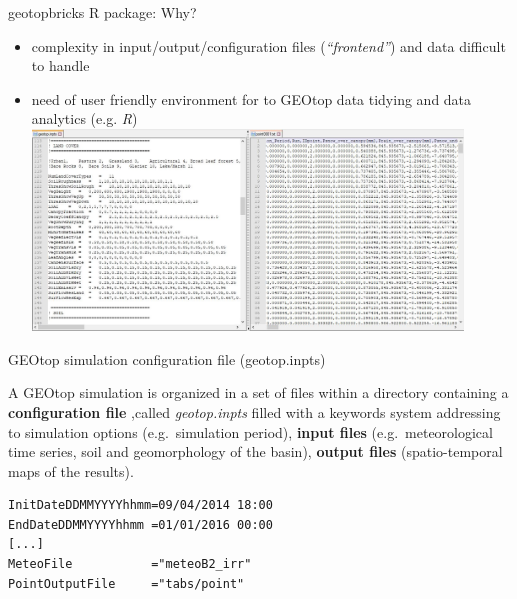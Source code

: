 \documentclass[ignorenonframetext,]{beamer}
\providecommand{\tightlist}{%
  \setlength{\itemsep}{0pt}\setlength{\parskip}{0pt}}
\begin{document}
\begin{frame}{geotopbricks R package: Why?}

\begin{itemize}
\tightlist
\item
  complexity in input/output/configuration files (\emph{``frontend''})
  and data difficult to handle
\item
  need of user friendly environment for to GEOtop data tidying and data
  analytics (e.g. \emph{R})
  \includegraphics[width=0.90000\textwidth]{resources/images/Capture_IO_GEOtopJPG.JPG}\\
\end{itemize}

\end{frame}

\begin{frame}[fragile]{GEOtop simulation configuration file
(geotop.inpts)}

A GEOtop simulation is organized in a set of files within a directory
containing a \textbf{configuration file} ,called \emph{geotop.inpts}
filled with a keywords system addressing to simulation options
(e.g.~simulation period), \textbf{input files} (e.g.~meteorological time
series, soil and geomorphology of the basin), \textbf{output files}
(spatio-temporal maps of the results).

\begin{verbatim}
InitDateDDMMYYYYhhmm=09/04/2014 18:00  
EndDateDDMMYYYYhhmm =01/01/2016 00:00 
[...] 
MeteoFile           ="meteoB2_irr" 
PointOutputFile     ="tabs/point" 
\end{verbatim}

\end{frame}
\end{document}
